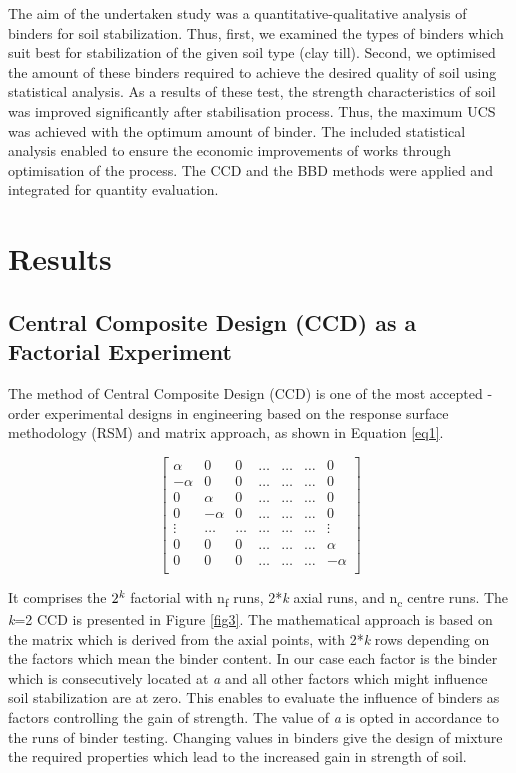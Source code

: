 \documentclass[eprint,
]{actapoly}
\begin{document}
The aim of the undertaken study was a quantitative-qualitative analysis of binders for soil stabilization. Thus, first, we examined the types of binders which suit best for stabilization of the given soil type (clay till). Second, we optimised the amount of these binders required to achieve the desired quality of soil using statistical analysis. As a results of these test, the strength characteristics of soil was improved significantly after stabilisation process. Thus, the maximum UCS was achieved with the optimum amount of binder. The included statistical analysis enabled to ensure the economic improvements of works through optimisation of the process. The CCD and the BBD methods were applied and integrated for quantity evaluation.

\section{Results}
\subsection{Central Composite Design (CCD) as a Factorial Experiment}
The method of Central Composite Design (CCD) is one of the most accepted -order experimental designs in engineering based on the response surface methodology (RSM) \cite{Montgomery2019} and matrix approach, as shown in Equation \ref{eq1}. 

\begin{equation}\label{eq1}
\begin{bmatrix}
\alpha & 0 & 0 & \ldots & \ldots & \ldots & 0 \\
-\alpha & 0 & 0 & \ldots & \ldots & \ldots & 0 \\
0 & \alpha & 0 & \ldots & \ldots & \ldots & 0 \\
0 & -\alpha & 0 & \ldots & \ldots & \ldots & 0 \\
\vdots & \ldots & \ldots & \ldots & \ldots & \ldots & \vdots \\
0 & 0 & 0 & \ldots & \ldots & \ldots & \alpha \\
0 & 0 & 0 & \ldots & \ldots & \ldots & -\alpha \\
\end{bmatrix}
\end{equation}

It comprises the $2^\emph{k}$ factorial with n\textsubscript{f} runs, 2*\emph{k} axial runs, and n\textsubscript{c} centre runs. The \emph{k}=2 CCD is presented in Figure \ref{fig3}. The mathematical approach is based on the matrix which is derived from the axial points, with 2*\emph{k} rows depending on the  factors which mean the binder content. In our case each factor is the binder which is  consecutively located at \emph{a} and all other factors which might influence soil stabilization are at zero. This enables to evaluate the influence of binders as factors controlling the gain of strength. The value of \emph{a} is opted in accordance to the runs of binder testing. Changing values in binders give the design of mixture the required properties which lead to the increased gain in strength of soil.
\end{document}
